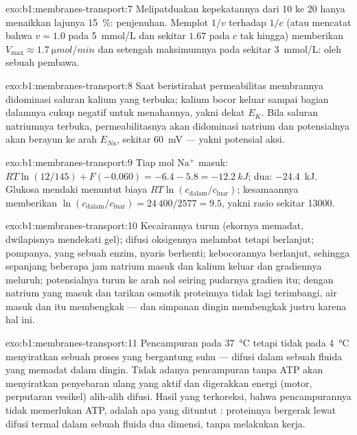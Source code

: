 \begin{solution}{exo:b1:membranes-transport:7}
Melipatduakan kepekatannya dari 10 ke 20 hanya menaikkan lajunya
\qty{15}{\%}: penjenuhan. Memplot $1/v$ terhadap $1/c$ (atau mencatat
bahwa $v = 1.0$ pada \qty{5}{mmol/L} dan sekitar $1.67$ pada $c$ tak
hingga) memberikan $V_{\max} \approx \qty{1.7}{\micro mol/min}$ dan
setengah maksimumnya pada sekitar \qty{3}{mmol/L}:  oleh
sebuah pembawa.
\end{solution}

\begin{solution}{exo:b1:membranes-transport:8}
Saat beristirahat permeabilitas membrannya didominasi saluran kalium
yang terbuka; kalium bocor keluar sampai bagian dalamnya cukup negatif
untuk menahannya, yakni dekat $E_K$. Bila saluran natriumnya terbuka,
permeabilitasnya akan didominasi natrium dan potensialnya akan berayun
ke arah $E_{Na}$, sekitar \qty{+60}{mV} --- yakni potensial aksi.
\end{solution}

\begin{solution}{exo:b1:membranes-transport:9}
Tiap mol $\mathrm{Na^+}$ masuk: $RT\ln(12/145) + F(-0.060) = -6.4 - 5.8
= \qty{-12.2}{kJ}$; dua: \qty{-24.4}{kJ}. Glukosa mendaki menuntut biaya
$RT\ln(c_{\text{dalam}}/c_{\text{luar}})$; kesamaannya memberikan
$\ln(c_{\text{dalam}}/c_{\text{luar}}) = 24\,400/2577 = 9.5$, yakni
rasio sekitar \num{13000}.
\end{solution}

\begin{solution}{exo:b1:membranes-transport:10}
Kecairannya turun (ekornya memadat, dwilapisnya mendekati gel); difusi
oksigennya melambat tetapi berlanjut; pompanya, yang sebuah enzim,
nyaris berhenti; kebocorannya berlanjut, sehingga sepanjang beberapa jam
natrium masuk dan kalium keluar dan gradiennya meluruh; potensialnya
turun ke arah nol seiring pudarnya gradien itu; dengan natrium yang
masuk dan tarikan osmotik proteinnya tidak lagi terimbangi, air masuk
dan  itu membengkak ---  dan  simpanan dingin membengkak
justru karena hal ini.
\end{solution}

\begin{solution}{exo:b1:membranes-transport:11}
Pencampuran pada \qty{37}{\celsius} tetapi tidak pada
\qty{4}{\celsius} menyiratkan sebuah proses yang bergantung suhu ---
difusi dalam sebuah fluida yang memadat dalam dingin. Tidak adanya
pencampuran tanpa ATP akan menyiratkan penyebaran ulang yang aktif dan
digerakkan energi (motor, perputaran vesikel) alih-alih difusi. Hasil
yang terkoreksi, bahwa pencampurannya tidak memerlukan ATP, adalah apa
yang dituntut : proteinnya bergerak lewat difusi termal
dalam sebuah fluida dua dimensi, tanpa  melakukan kerja.
\end{solution}

